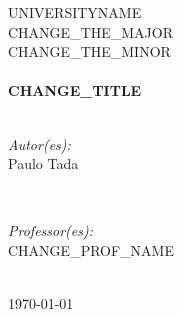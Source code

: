 \begin{titlepage}

\center %
 

\textsc{\LARGE UNIVERSITYNAME}\\[1.5cm]	%
\textsc{\Large CHANGE\_THE\_MAJOR}\\[0.5cm]		%
\textsc{\large CHANGE\_THE\_MINOR}\\[0.5cm]		%


\HRule \\[0.4cm]
{ \huge \bfseries CHANGE\_TITLE}\\[0.4cm] %
\HRule \\[1.5cm]
 

\begin{minipage}{0.4\textwidth}
\begin{flushleft} \large
\emph{Autor(es):}\\
Paulo Tada %
\end{flushleft}
\end{minipage}
~
\begin{minipage}{0.4\textwidth}
\begin{flushright} \large
\emph{Professor(es):} \\
CHANGE\_PROF\_NAME %
\end{flushright}
\end{minipage}\\[4cm]


{\large \today}\\[3cm] %



\vfill %

\end{titlepage}